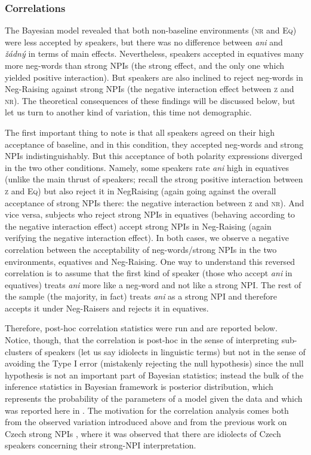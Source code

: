 \documentclass[output=paper,colorlinks,citecolor=brown]{langscibook}
\begin{document}
\subsubsection{Correlations}\label{sec:corr}

The Bayesian model revealed that both non-baseline environments (\textsc{nr} and \textsc{Eq}) were less accepted by speakers, but there was no difference between \textit{ani} and \textit{žádný} in terms of main effects. Nevertheless, speakers accepted in equatives many more neg-words than strong NPIs (the strong effect, and the only one which yielded positive interaction). But speakers are also inclined to reject neg-words in Neg-Raising against strong NPIs (the negative interaction effect between \textsc{z} and \textsc{nr}). The theoretical consequences of these findings will be discussed below, but let us turn to another kind of variation, this time not demographic.

The first important thing to note is that all speakers agreed on their high acceptance of baseline, and in this condition, they accepted neg-words and strong NPIs indistinguishably. But this acceptance of both polarity expressions diverged in the two other conditions. Namely, some speakers rate \textit{ani} high in equatives (unlike the main thrust of speakers; recall the strong positive interaction between \textsc{z} and \textsc{Eq}) but also reject it in NegRaising (again going against the overall acceptance of strong NPIs there: the negative interaction between \textsc{z} and \textsc{nr}). And vice versa, subjects who reject strong NPIs in equatives (behaving according to the negative interaction effect) accept strong NPIs in Neg-Raising (again verifying the negative interaction effect). In both cases, we observe a negative correlation between the acceptability of neg-words/strong NPIs in the two environments, equatives and Neg-Raising. One way to understand this reversed correlation is to assume that the first kind of speaker (those who accept \textit{ani} in equatives) treats \textit{ani} more like a neg-word and not like a strong NPI. The rest of the sample (the majority, in fact) treats \textit{ani} as a strong NPI and therefore accepts it under Neg-Raisers and rejects it in equatives.

Therefore, post-hoc correlation statistics were run and are reported below. Notice, though, that the correlation is post-hoc in the sense of interpreting sub-clusters of speakers (let us say idiolects in linguistic terms) but not in the sense of avoiding the Type I error (mistakenly rejecting the null hypothesis) since the null hypothesis is not an important part of Bayesian statistics; instead the bulk of the inference statistics in Bayesian framework is posterior distribution, which represents the probability of the parameters of a model given the data and which was reported here in . The motivation for the correlation analysis comes both from the observed variation introduced above and from the previous work on Czech strong NPIs \citep{docekaldotlacilsubber,dovcekal2020n}, where it was observed that there are idiolects of Czech speakers concerning their strong-NPI interpretation.
\end{document}
